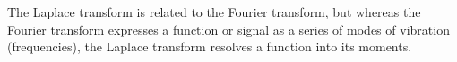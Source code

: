 \documentclass[12pt, a4paper]{article}
\begin{document}
The Laplace transform is related to the Fourier transform, but whereas the Fourier transform expresses a function or signal as a series of modes of vibration (frequencies), the Laplace transform resolves a function into its moments.
\printindex
\end{document}
